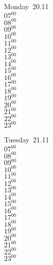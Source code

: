 \documentclass[11pt, a4paper]{book}\usepackage[]{graphicx}\usepackage[]{color}
\begin{document}
\begin{headerbox}
\end{headerbox}
\begin{weekdaybox}
  Monday~20.11\\
  { 
  \vfill
  $07^{00}$\\
$08^{00}$\\
$09^{00}$\\
$10^{00}$\\
$11^{00}$\\
$12^{00}$\\
$13^{00}$\\
$14^{00}$\\
$15^{00}$\\
$16^{00}$\\
$17^{00}$\\
$18^{00}$\\
$19^{00}$\\
$20^{00}$\\
$21^{00}$\\
$22^{00}$\\
$23^{00}$\\
  }
\end{weekdaybox}
\begin{weekdaybox}
  Tuesday~21.11\\
  { 
  \vfill
  $07^{00}$\\
$08^{00}$\\
$09^{00}$\\
$10^{00}$\\
$11^{00}$\\
$12^{00}$\\
$13^{00}$\\
$14^{00}$\\
$15^{00}$\\
$16^{00}$\\
$17^{00}$\\
$18^{00}$\\
$19^{00}$\\
$20^{00}$\\
$21^{00}$\\
$22^{00}$\\
$23^{00}$\\
  }
\end{weekdaybox}
\end{document}
